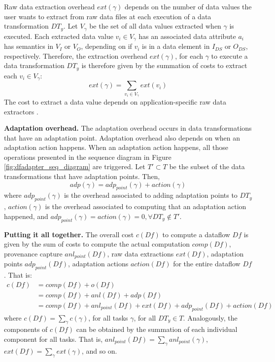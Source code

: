 Raw data extraction overhead $ext(\gamma)$ 
depends on the number of data values the user wants to extract from raw
data files at each execution of a data transformation $DT_y$.
Let $V_\gamma$ be the
set of all data values extracted when $\gamma$ is executed. Each
extracted data value $v_i \in V_\gamma$ has an associated data
attribute $a_i$ has semantics in $V_I$ or $V_O$, depending on if
$v_i$ is in a data element in $I_{DS}$ or $O_{DS}$, respectively.
Therefore, the extraction overhead $ext(\gamma)$, for each
$\gamma$ to execute a data transformation $DT_y$ is therefore given by the summation of
costs to extract each $v_i \in V_\gamma$:
\begin{equation}
    ext(\gamma) = \sum_{v_i \in V_\gamma} ext(v_i)
\end{equation}
The cost to extract a data value depends on application-specific raw
data extractors \cite{Silva2017Raw}.


\textbf{Adaptation overhead.} 
The adaptation overhead occurs in
data transformations that have an adaptation point. Adaptation overhead also
depends on when an adaptation action happens.
When an adaptation action
happens, all those operations presented in the sequence diagram in
Figure \ref{fig:dfadapter_seq_diagram} are triggered. 
Let $T' \subset T $ be the subset of the data
transformations that have adaptation points. Then,
\begin{equation}
\label{eq_5}
    adp(\gamma) = adp_{point}(\gamma) + action(\gamma) 
\end{equation}
\noindent 
where 
$adp_{point}(\gamma)$
is the overhead associated
to adding adaptation points to $DT_y$,
$action(\gamma)$
is the overhead associated to
computing that an adaptation action happened, and
$adp_{point}(\gamma) = action(\gamma) = 0, \forall DT_y \notin T'$.



\textbf{Putting it all together.} The overall cost
$c(Df)$ to compute a dataflow $Df$ is
given by the sum of costs to compute the
actual computation $comp(Df)$,
provenance capture $anl_{point}(Df)$, 
raw data extractions $ext(Df)$,
adaptation points $adp_{point}(Df)$,
adaptation actions $action(Df)$
for the entire dataflow $Df$. That is:
\begin{equation} 
\label{final_eq}
\begin{split}
c(Df)   & = comp(Df) + o(Df)                                  \\
        & = comp(Df) + anl(Df) + adp(Df)                     \\
        & = comp(Df) + anl_{point}(Df) + ext(Df) + adp_{point}(Df) + action(Df) 
\end{split}
\end{equation}
\noindent where
$c(Df) = \sum_\gamma c(\gamma)$, for all tasks $\gamma$, for all $DT_y \in T$.
Analogously, the components of
$c(Df)$ can be obtained by the summation of each
individual component for all tasks.
That is,
$anl_{point}(Df) = \sum_\gamma anl_{point}(\gamma)$, 
$ext(Df) = \sum_\gamma ext(\gamma)$,
and so on.

